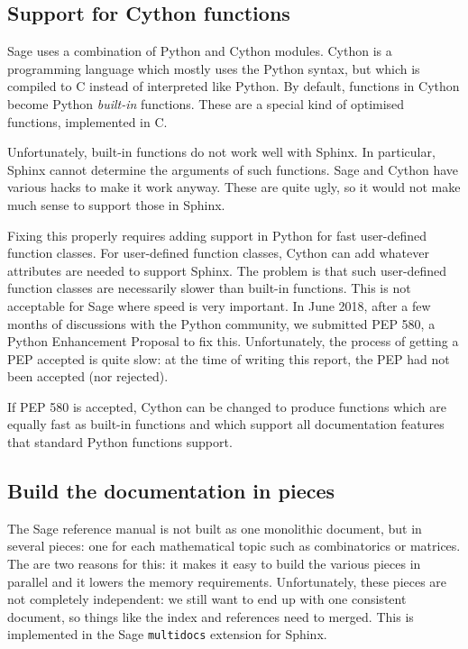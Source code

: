 \documentclass{deliverablereport}
\begin{document}
\subsection{Support for Cython functions}

Sage uses a combination of Python and Cython modules.
Cython is a programming language which mostly uses the Python syntax,
but which is compiled to C instead of interpreted like Python.
By default, functions in Cython become Python \emph{built-in} functions.
These are a special kind of optimised functions, implemented in C.

Unfortunately, built-in functions do not work well with Sphinx.
In particular, Sphinx cannot determine the arguments of such functions.
Sage and Cython have various hacks to make it work anyway.
These are quite ugly, so it would not make much sense to support those in Sphinx.

Fixing this properly requires adding support in Python
for fast user-defined function classes.
For user-defined function classes, Cython can add whatever attributes
are needed to support Sphinx.
The problem is that such user-defined function classes
are necessarily slower than built-in functions.
This is not acceptable for Sage where speed is very important.
In June 2018, after a few months of discussions with the Python community,
we submitted PEP 580, a Python Enhancement Proposal to fix this.
Unfortunately, the process of getting a PEP accepted is quite slow:
at the time of writing this report, the PEP had not been accepted (nor rejected).

If PEP 580 is accepted, Cython can be changed to produce
functions which are equally fast as built-in functions
and which support all documentation
features that standard Python functions support.

\subsection{Build the documentation in pieces}

The Sage reference manual is not built as one monolithic document,
but in several pieces:
one for each mathematical topic such as combinatorics or matrices.
The are two reasons for this: it makes it easy to build the various pieces
in parallel and it lowers the memory requirements.
Unfortunately, these pieces are not completely independent:
we still want to end up with one consistent document,
so things like the index and references need to merged.
This is implemented in the Sage \texttt{multidocs} extension for Sphinx.
\end{document}
